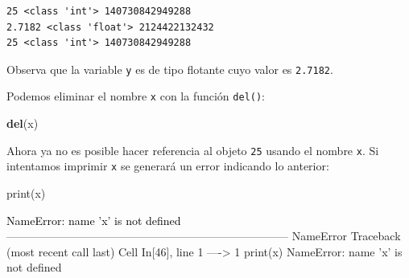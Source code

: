 \documentclass[
  spanish,
  letterpaper,
]{scrbook}
\newenvironment{Shaded}{\begin{snugshade}}{\end{snugshade}}
\newcommand{\BuiltInTok}[1]{\textcolor[rgb]{0.00,0.23,0.31}{#1}}
\newcommand{\KeywordTok}[1]{\textcolor[rgb]{0.00,0.23,0.31}{\textbf{#1}}}
\newcommand{\NormalTok}[1]{\textcolor[rgb]{0.00,0.23,0.31}{#1}}
\theoremstyle{definition}
\theoremstyle{remark}
\begin{document}
\begin{verbatim}
25 <class 'int'> 140730842949288
2.7182 <class 'float'> 2124422132432
25 <class 'int'> 140730842949288
\end{verbatim}

Observa que la variable \texttt{y} es de tipo flotante cuyo valor es
\texttt{2.7182}.

Podemos eliminar el nombre \texttt{x} con la función \texttt{del()}:

\begin{Shaded}
\begin{Highlighting}[]
\KeywordTok{del}\NormalTok{(x)}
\end{Highlighting}
\end{Shaded}

Ahora ya no es posible hacer referencia al objeto \texttt{25} usando el
nombre \texttt{x}. Si intentamos imprimir \texttt{x} se generará un
error indicando lo anterior:

\begin{Shaded}
\begin{Highlighting}[]
\BuiltInTok{print}\NormalTok{(x)}
\end{Highlighting}
\end{Shaded}

\begin{Highlighting}
\textcolor{black}{NameError: name 'x' is not defined}
\textcolor{black}{}\textcolor{QuartoInternalColor1}{---------------------------------------------------------------------------}\textcolor{QuartoInternalColor2}{}
\textcolor{QuartoInternalColor2}{}\textcolor{QuartoInternalColor1}{NameError}\textcolor{QuartoInternalColor2}{                                 Traceback (most recent call last)}
\textcolor{QuartoInternalColor2}{}\textcolor{QuartoInternalColor3}{Cell}\textcolor{QuartoInternalColor2}{}\textcolor{QuartoInternalColor3}{ }\textcolor{QuartoInternalColor2}{}\textcolor{QuartoInternalColor4}{In[46]}\textcolor{QuartoInternalColor2}{}\textcolor{QuartoInternalColor4}{, line 1}\textcolor{QuartoInternalColor2}{}
\textcolor{QuartoInternalColor2}{}\textcolor{QuartoInternalColor4}{----> }\textcolor{QuartoInternalColor2}{}\textcolor{QuartoInternalColor4}{1}\textcolor{QuartoInternalColor2}{ }\textcolor{QuartoInternalColor5}{print}\textcolor{QuartoInternalColor2}{(}\textcolor{QuartoInternalColor2}{x}\textcolor{QuartoInternalColor2}{)}
\textcolor{QuartoInternalColor2}{}\textcolor{QuartoInternalColor1}{NameError}\textcolor{QuartoInternalColor2}{: name 'x' is not defined}
\end{Highlighting}
\end{document}
